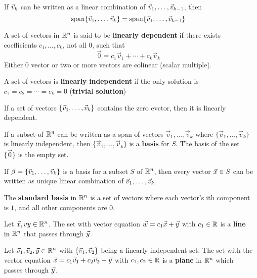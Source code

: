 \documentclass[english, 12pt]{article}
\begin{document}
\begin{thrm}
If $\vec{v}_{k}$ can be written as a linear combination of $\vec{v}_{1},\dots,\vec{v}_{k-1}$, then
\[\operatorname{span}\{\vec{v}_{1},\dots,\vec{v}_{k}\} = \operatorname{span}\{\vec{v}_{1},\dots,\vec{v}_{k-1}\}\]
\end{thrm}

\begin{defn}
A set of vectors in ${\mathbb{R}}^n$ is said to be \textbf{linearly dependent} if there exists coefficients $c_{1},\dots,c_{k}$, not all $0$, such that
\[\vec{0} = c_{1} \vec{v}_{1} + \cdots + c_{k} \vec{v}_{k}\]
Either $0$ vector or two or more vectors are colinear (scalar multiple).
\end{defn}

\begin{defn}
A set of vectors is \textbf{linearly independent} if the only solution is $c_{1} = c_{2} = \cdots = c_{k} = 0$ (\textbf{trivial solution})
\end{defn}

\begin{thrm}
If a set of vectors $\{\vec{v}_{1},\dots,\vec{v}_{k}\}$ contains the zero evctor, then it is linearly dependent.
\end{thrm}

\begin{defn}
If a subset of ${\mathbb{R}}^n$ can be written as a span of vectors $\vec{v}_{1},\dots,\vec{v}_{k}$ where $\{\vec{v}_{1},\dots,\vec{v}_{k}\}$ is linearly independent, then $\{\vec{v}_{1},\dots,\vec{v}_{k}\}$ is a \textbf{basis} for $S$. The basis of the set $\{\vec{0}\}$ is the empty set.
\end{defn}

\begin{thrm}
If $\beta= \{\vec{v}_{1},\dots,\vec{v}_{k}\}$ is a basis for a subset $S$ of ${\mathbb{R}}^n$, then every vector $\vec{x} \in S$ can be written as unique linear combination of $\vec{v}_{1},\dots,\vec{v}_{k}$.
\end{thrm}

\begin{defn}
The \textbf{standard basis} in ${\mathbb{R}}^n$ is a set of vectors where each vector's ith component is $1$, and all other components are $0$.
\end{defn}

\begin{defn}
Let $\vec{x},vy \in {\mathbb{R}}^n$. The set with vector equation $\vec{w} = c_{1} \vec{x} + \vec{y}$ with $ c_{1} \in {\mathbb{R}}$ is a \textbf{line} in ${\mathbb{R}}^n$ that passes through $\vec{y}$.
\end{defn}

\begin{defn}
Let $\vec{v}_{1},\vec{v}_{2},\vec{y} \in {\mathbb{R}}^n$ with $\{\vec{v}_{1},\vec{v}_{2}\}$ being a linearly independent set. The set with the vector equation $\vec{x} = c_{1} \vec{v}_{1} + c_{2} \vec{v}_{2} + \vec{y}$ with $c_{1},c_{2} \in {\mathbb{R}}$ is a \textbf{plane} in ${\mathbb{R}}^n$ which passes through $\vec{y}$.
\end{defn}
\end{document}
